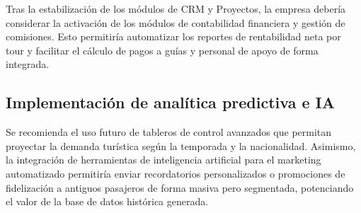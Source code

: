 \begin{indentedsubsection}
Tras la estabilización de los módulos de CRM y Proyectos, la empresa debería considerar la activación de los módulos de contabilidad financiera y gestión de comisiones. Esto permitiría automatizar los reportes de rentabilidad neta por tour y facilitar el cálculo de pagos a guías y personal de apoyo de forma integrada.

\end{indentedsubsection}

\subsection{Implementación de analítica predictiva e IA}

\begin{indentedsubsection}
Se recomienda el uso futuro de tableros de control avanzados que permitan proyectar la demanda turística según la temporada y la nacionalidad. Asimismo, la integración de herramientas de inteligencia artificial para el marketing automatizado permitiría enviar recordatorios personalizados o promociones de fidelización a antiguos pasajeros de forma masiva pero segmentada, potenciando el valor de la base de datos histórica generada.

\end{indentedsubsection}

